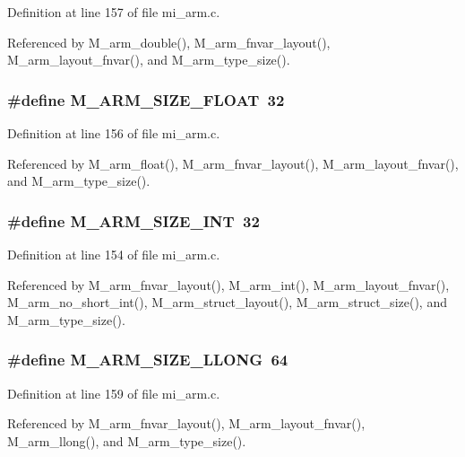 Definition at line 157 of file mi\_\-arm.c.

Referenced by M\_\-arm\_\-double(), M\_\-arm\_\-fnvar\_\-layout(), M\_\-arm\_\-layout\_\-fnvar(), and M\_\-arm\_\-type\_\-size().
\subsubsection{\setlength{\rightskip}{0pt plus 5cm}\#define M\_\-ARM\_\-SIZE\_\-FLOAT~32}\label{mi__arm_8c_8315f0d2c5f95743dd63e362566c4cea}




Definition at line 156 of file mi\_\-arm.c.

Referenced by M\_\-arm\_\-float(), M\_\-arm\_\-fnvar\_\-layout(), M\_\-arm\_\-layout\_\-fnvar(), and M\_\-arm\_\-type\_\-size().
\subsubsection{\setlength{\rightskip}{0pt plus 5cm}\#define M\_\-ARM\_\-SIZE\_\-INT~32}\label{mi__arm_8c_5e93cafac4413f16a5c855f0f265e83e}




Definition at line 154 of file mi\_\-arm.c.

Referenced by M\_\-arm\_\-fnvar\_\-layout(), M\_\-arm\_\-int(), M\_\-arm\_\-layout\_\-fnvar(), M\_\-arm\_\-no\_\-short\_\-int(), M\_\-arm\_\-struct\_\-layout(), M\_\-arm\_\-struct\_\-size(), and M\_\-arm\_\-type\_\-size().
\subsubsection{\setlength{\rightskip}{0pt plus 5cm}\#define M\_\-ARM\_\-SIZE\_\-LLONG~64}\label{mi__arm_8c_9d5adf297f89b68a90e131f96264f09d}




Definition at line 159 of file mi\_\-arm.c.

Referenced by M\_\-arm\_\-fnvar\_\-layout(), M\_\-arm\_\-layout\_\-fnvar(), M\_\-arm\_\-llong(), and M\_\-arm\_\-type\_\-size().
